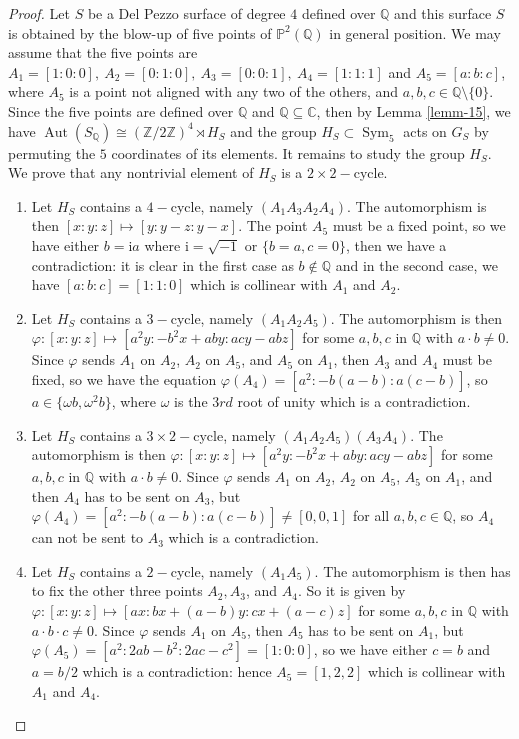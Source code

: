 \documentclass[leqno,12pt]{amsart} %
\newcommand{\Z}{\ensuremath{\mathbb{Z}}}
\newcommand{\Q}{\ensuremath{\mathbb{Q} }}
\newcommand{\C}{\ensuremath{\mathbb{C} }}
\newcommand{\p}{\ensuremath{\mathbb{P} }}
\DeclareMathOperator{\Aut}{Aut}
\DeclareMathOperator{\sym}{Sym}
\begin{document}
\begin{proof}
Let $S$ be a Del Pezzo surface of degree $4$ defined over $\Q $ and this surface $S$ is obtained by the blow-up of five points of $\p^2(\Q )$ in general position. We may assume that the five points are $A_1 = [1 : 0 : 0],~A_2 = [0: 1 : 0],~A_3 = [0 : 0: 1],~A_4 = [1: 1: 1]$ and $A_5 = [a: b: c]$, where $A_5$ is a point not aligned with any two of the others, and $a,b,c\in \Q \setminus\{0\}$. Since the five points are defined over $\Q $ and $\Q \subseteq\C $, then by Lemma \ref{lemm-15}, we have $\Aut(S_{\Q })\cong (\Z /2\Z )^4\rtimes H_{S}$ and the group $H_{S}\subset\sym_5$ acts on $G_{S}$ by permuting the $5$ coordinates of its elements. It remains to study the group $H_S$. We prove that any nontrivial element of $H_S$ is a $2\times2-$cycle.
\begin{enumerate}
 
 \item Let $H_S$ contains a $4-$cycle, namely $(A_1 A_3A_2A_4)$. The automorphism is then $[x:y:z] \mapsto [y : y-z: y-x]$. The point $A_5$ must be a fixed point, so we have either $b=\mathrm{i}a$ where $\mathrm{i}=\sqrt{-1}$  or $\{b=a,c=0\}$, then we have a contradiction: it is clear in the first case as $b\notin \Q $ and in the second case, we have $[a:b:c]=[1:1:0]$ which is collinear with $A_1$ and $A_2$.
 
\item Let $H_S$ contains a $3-$cycle, namely $(A_1 A_2A_5)$. The automorphism is then $\varphi:[x : y : z] \mapsto [a^2y : -b^2x+aby : acy-ab z]$ for some $a,b,c$ in $\Q $ with $a\cdot b\neq0$. Since $\varphi$ sends $A_1$ on $A_2$, $A_2$ on $A_5$, and $A_5$ on $A_1$, then $A_3$ and $A_4$ must be fixed, so we have the equation $\varphi(A_4)=[a^2:-b(a-b):a(c-b)]$, so $a\in\{\omega b,\omega^2b\}$, where $\omega$ is the $3rd$ root of unity which is a contradiction.
 
\item Let $H_S$ contains a $3\times2-$cycle, namely $(A_1 A_2A_5)(A_3A_4)$. The automorphism is then $\varphi:[x : y : z] \mapsto [a^2y : -b^2x+aby : acy-ab z]$ for some $a,b,c$ in $\Q $ with $a\cdot b\neq0$. Since $\varphi$ sends $A_1$ on $A_2$, $A_2$ on $A_5$, $A_5$ on $A_1$, and then $A_4$ has to be sent on $A_3$, but $\varphi(A_4)=[a^2:-b(a-b):a(c-b)]\ne[0,0,1]$ for all $a,b,c\in\Q $, so $A_4$ can not be sent to $A_3$ which is a contradiction.
 
\item Let $H_S$ contains a $2-$cycle, namely $(A_1A_5)$. The automorphism is then has to fix the other three points $A_2,A_3$, and $A_4$. So it is given by $\varphi:[x : y : z] \mapsto [ax : bx+(a-b)y : cx+(a-c) z]$ for some $a,b,c$ in $\Q $ with $a\cdot b\cdot c\neq0$. Since $\varphi$ sends $A_1$ on $A_5$, then $A_5$ has to be sent on $A_1$, but $\varphi(A_5)=[a^2:2ab-b^2:2ac-c^2]=[1:0:0]$, so we have either $c=b$ and $a=b/2$ which is a contradiction: hence $A_5=[1,2,2]$ which is collinear with $A_1$ and $A_4$.
 

\end{enumerate}
\end{proof}
\end{document}
